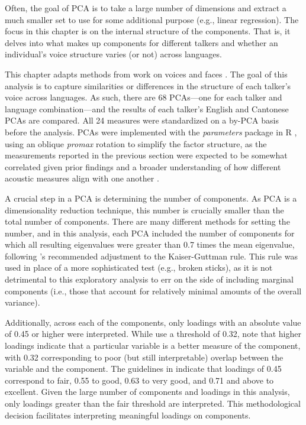 Often, the goal of PCA is to take a large number of dimensions and extract a much smaller set to use for some additional purpose (e.g., linear regression). The focus in this chapter is on the internal structure of the components. That is, it delves into what makes up components for different talkers and whether an individual's voice structure varies (or not) across languages. 

This chapter adapts methods from work on voices \citep{lee_2019_acoustic, lee_2020_language} and faces \citep{burton_2016_faces, turk_1991_eigenfaces}. The goal of this analysis is to capture similarities or differences in the structure of each talker's voice across languages. As such, there are 68 PCAs---one for each talker and language combination---and the results of each talker's English and Cantonese PCAs are compared. All 24 measures were standardized on a by-PCA basis before the analysis. PCAs were implemented with the \textit{parameters} package \citep{ludecke_2020_parameters} in R \citep{r_2021}, using an oblique \textit{promax} rotation to simplify the factor structure, as the measurements reported in the previous section were expected to be somewhat correlated given prior findings \citep{lee_2019_acoustic} and a broader understanding of how different acoustic measures align with one another \citep{kreiman_2014_theory, kreiman_2021_validating}.

A crucial step in a PCA is determining the number of components. As PCA is a dimensionality reduction technique, this number is crucially smaller than the total number of components. There are many different methods for setting the number, and in this analysis, each PCA included the number of components for which all resulting eigenvalues were greater than 0.7 times the mean eigenvalue, following \citeauthor{jolliffe_2002_pca}'s \citeyearpar{jolliffe_2002_pca} recommended adjustment to the Kaiser-Guttman rule. This rule was used in place of a more sophisticated test (e.g., broken sticks), as it is not detrimental to this exploratory analysis to err on the side of including marginal components (i.e., those that account for relatively minimal amounts of the overall variance). 

Additionally, across each of the components, only loadings with an absolute value of 0.45 or higher were interpreted. While \citet{lee_2019_acoustic} use a threshold of 0.32, \citet{tabachnick_2013_statistics} note that higher loadings indicate that a particular variable is a better measure of the component, with 0.32 corresponding to poor (but still interpretable) overlap between the variable and the component. The guidelines in \citet{tabachnick_2013_statistics} indicate that loadings of 0.45 correspond to fair, 0.55 to good, 0.63 to very good, and 0.71 and above to excellent. Given the large number of components and loadings in this analysis, only loadings greater than the fair threshold are interpreted. This methodological decision facilitates interpreting meaningful loadings on components. 

